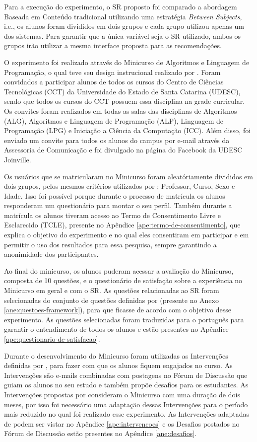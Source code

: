 Para a execução do experimento, o SR proposto foi comparado a abordagem Baseada em Conteúdo tradicional utilizando uma
estratégia \textit{Between Subjects}, i.e., os alunos foram divididos em dois grupos e cada grupo utilizou apenas
um dos sistemas. Para garantir que a única variável seja o SR utilizado, ambos os grupos irão utilizar a mesma
interface proposta para as recomendações.

O experimento foi realizado através do Minicurso de Algoritmos e Linguagem de Programação, o qual teve seu design instrucional realizado por .
Foram convidados a participar alunos de todos os cursos do Centro de Ciências Tecnológicas (CCT) da Universidade do
Estado de Santa Catarina (UDESC), sendo que todos os cursos do CCT possuem essa disciplina na grade curricular. Os convites
foram realizados em todas as salas das disciplinas de Algoritmos (ALG), Algoritmos e Linguagem de Programação (ALP), Linguagem
de Programação (LPG) e Iniciação a Ciência da Computação (ICC). Além disso, foi enviado um convite para todos os alunos do
campus por e-mail através da Assessoria de Comunicação e foi divulgado na página do Facebook da UDESC Joinville.

Os usuários que se matricularam no Minicurso foram aleatóriamente divididos em dois grupos, pelos mesmos critérios
utilizados por : Professor, Curso, Sexo e Idade. Isso foi possível porque durante o processo de
matrícula os alunos responderam um questionário para montar o seu perfil. Também durante a matrícula os alunos tiveram
acesso ao Termo de Consentimento Livre e Esclarecido (TCLE), presente no Apêndice \ref{ape:termo-de-consentimento}, que
explica o objetivo do experimento e no qual eles consentiram em participar e em permitir o uso dos
resultados para essa pesquisa, sempre garantindo a anonimidade dos participantes.

Ao final do minicurso, os alunos puderam acessar a avaliação do Minicurso, composta de 10 questões, e o questionário
de satisfação sobre a experiência no Minicurso em geral e com o SR. As questões relacionadas ao SR foram selecionadas do
conjunto de questões definidas por  (presente no Anexo \ref{ane:questoes-framework}), para que
ficasse de acordo com o objetivo desse experimento. As questões selecionadas foram traduzidas para o português para garantir o entendimento de todos os alunos
e estão presentes no Apêndice \ref{ape:questionario-de-satisfacao}.

Durante o desenvolvimento do Minicurso foram utilizadas as Intervenções definidas por , para
fazer com que os alunos fiquem engajados no curso. As Intervenções são e-mails combinadas com postagens no Fórum de Discussão
que guiam os alunos no seu estudo e também propõe desafios para os estudantes. As Intervenções propostas por 
consideram o Minicurso com uma duração de dois meses, por isso foi necessário uma adaptação dessas Intervenções para o período
mais reduzido no qual foi realizado esse experimento. As Intervenções adaptadas de  podem
ser vistar no Apêndice \ref{ape:intervencoes} e os Desafios postados no Fórum de Discussão estão presentes no Apêndice \ref{ane:desafios}.

